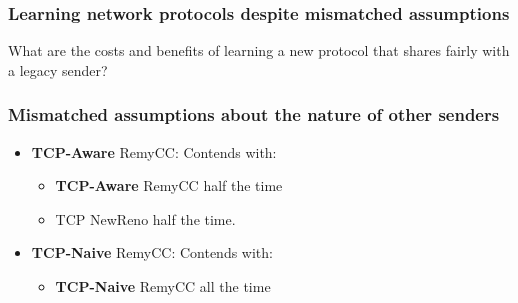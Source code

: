 \begin{frame}
\frametitle{Learning network protocols despite mismatched assumptions}
\begin{centering}
What are the costs and benefits of learning a new protocol that shares fairly with a legacy sender?
\end{centering}
\end{frame}

\begin{frame}
\frametitle{Mismatched assumptions about the nature of other senders}
\begin{itemize}
\item<1-> \textbf{TCP-Aware} RemyCC: Contends with:
 \begin{itemize}
 \item \textbf{TCP-Aware} RemyCC half the time
 \item TCP NewReno half the time.
 \end{itemize}
\item<2-> \textbf{TCP-Naive} RemyCC: Contends with:
 \begin{itemize}
 \item \textbf{TCP-Naive} RemyCC all the time
 \end{itemize}
\end{itemize}
\end{frame}

